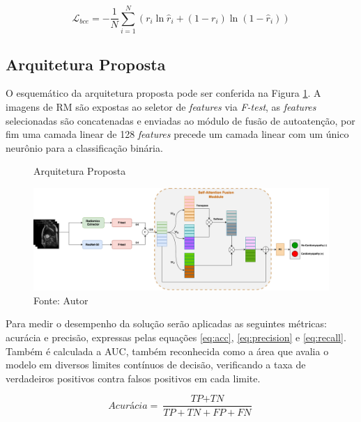 \begin{equation}
\mathcal{L}_{bce} = -\frac{1}{N} \sum_{i=1}^N
(r_i \ln \hat{r}_i + (1 - r_i) \ln (1 - \hat{r}_i))
\label{eq:bce}
\end{equation}

\subsection{Arquitetura Proposta}
\label{subsec:cap4_arquitetura_proposta}

O esquemático da arquitetura proposta pode ser conferida na Figura \ref{fig:fig011}. A imagens de \gls{RM} são expostas ao seletor de \textit{features} via \textit{F-test}, as \textit{features} selecionadas são concatenadas e enviadas ao módulo de fusão de autoatenção, por fim uma camada linear de 128 \textit{features} precede um camada linear com um único neurônio para a classificação binária.

\begin{figure}[htbp]
    \centering
    \caption{Arquitetura Proposta}
    \includegraphics[width=1\textwidth]{figures/fig011.png}
    \caption*{Fonte: Autor}
    \label{fig:fig011}
\end{figure}

Para medir o desempenho da solução serão aplicadas as seguintes métricas: acurácia e precisão, expressas pelas equações \ref{eq:acc}, \ref{eq:precision} e \ref{eq:recall}.
Também é calculada a \gls{AUC}, também reconhecida como a área que avalia o modelo em diversos limites contínuos de decisão, verificando a taxa de verdadeiros positivos contra falsos positivos em cada limite.


\begin{equation}
\textit{Acurácia} = \frac{\textit{TP} + \textit{TN}}{\textit{TP} + \textit{TN} + \textit{FP} + \textit{FN}}
\label{eq:acc}
\end{equation}

